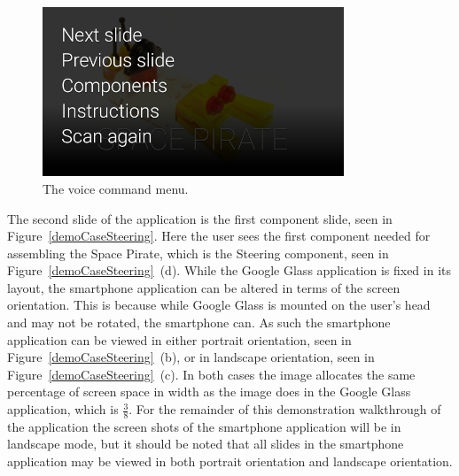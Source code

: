 	\begin{figure}[H]%
		\centering
		\includegraphics[width=90mm]{images/demoCase/glassVoiceCommand}
		\caption{The voice command menu.}
		\label{demoCaseVoiceCommand}
	\end{figure}


The second slide of the application is the first component slide, seen in Figure~\ref{demoCaseSteering}. Here the user sees the first component needed for assembling the Space Pirate, which is the Steering component, seen in Figure~\ref{demoCaseSteering}~(d). While the Google Glass application is fixed in its layout, the smartphone application can be altered in terms of the screen orientation. This is because while Google Glass is mounted on the user's head and may not be rotated, the smartphone can. As such the smartphone application can be viewed in either portrait orientation, seen in Figure~\ref{demoCaseSteering}~(b), or in landscape orientation, seen in Figure~\ref{demoCaseSteering}~(c). In both cases the image allocates the same percentage of screen space in width as the image does in the Google Glass application, which is \(\frac{3}{8}\). For the remainder of this demonstration walkthrough of the application the screen shots of the smartphone application will be in landscape mode, but it should be noted that all slides in the smartphone application may be viewed in both portrait orientation and landscape orientation.

